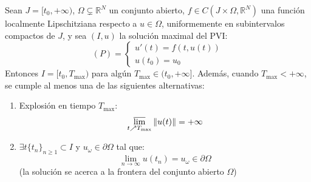 \begin{teorema} 
    Sean $J = [t_0, +\infty)$, $\Omega \subsetneq \mathbb{R}^N$ un conjunto abierto, $f \in C(J \times \Omega, \mathbb{R}^N)$ una función localmente Lipschitziana respecto a $u \in \Omega$, uniformemente en subintervalos compactos de $J$, y sea $(I, u)$ la solución maximal del PVI:
    \[
        (P) =
        \begin{cases}
            u'(t) = f(t, u(t)) \\
            u(t_0) = u_0
        \end{cases}
    \]
    Entonces $I = [t_0, T_{\text{max}})$ para algún $T_{\text{max}} \in (t_0, +\infty]$. Además, cuando $T_{\text{max}} < +\infty$, se cumple al menos una de las siguientes alternativas:
    \begin{enumerate}
        \item Explosión en tiempo $T_{\text{max}}$:
        \[
            \varlimsup_{t \nearrow T_{\text{max}}} \| u(t) \| = +\infty
        \]
        \item $\exists t\{t_n\}_{n \geq 1} \subset I$ y $u_\omega \in \partial \Omega$ tal que:
        \[
            \lim_{n \to \infty} u(t_n) = u_\omega \in \partial \Omega
        \]
        (la solución se acerca a la frontera del conjunto abierto $\Omega$)
    \end{enumerate}
\end{teorema}

